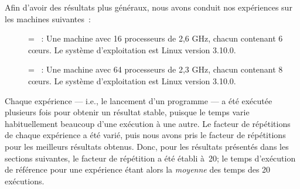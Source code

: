 \goodbreak
\begin{samepage}
Afin d'avoir des r\'esultats plus g\'en\'eraux, nous avons conduit nos exp\'eriences sur les machines suivantes~:
\label{machines.sect}


\begin{description}
\item[] = ~: Une machine avec 16 processeurs de 2,6 GHz, chacun contenant 6 cœurs. Le syst\`eme d'exploitation est Linux version 3.10.0. 


\item[] = ~:  Une machine avec 64 processeurs de 2,3 GHz, chacun contenant 8 cœurs. Le système d'exploitation est Linux version 3.10.0.


\end{description}
\end{samepage}



Chaque exp\'erience --- i.e., le lancement d'un programme --- a \'et\'e ex\'ecut\'ee plusieurs fois pour obtenir un r\'esultat stable, puisque le temps varie habituellement beaucoup d'une ex\'ecution \`a une autre. Le facteur de r\'ep\'etitions de chaque exp\'erience a \'et\'e vari\'e, puis nous avons pris le facteur de r\'ep\'etitions pour les meilleurs r\'esultats obtenus.
%
Donc, pour les r\'esultats pr\'esent\'es dans les sections suivantes, le facteur de r\'ep\'etition a \'et\'e \'etabli \`a~20; le temps d'ex\'ecution de r\'ef\'erence pour une exp\'erience \'etant alors la \emph{moyenne} des temps des 20 ex\'ecutions.



